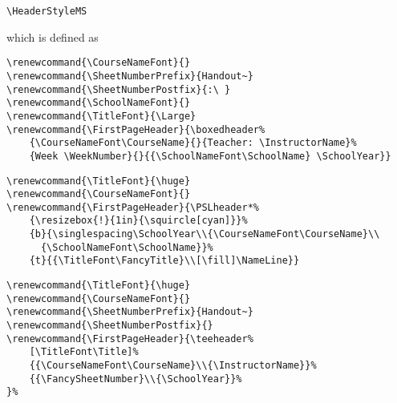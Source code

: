\documentclass[12pt,twoside,parskip,notitle,showframe]{handout}
\begin{document}
\newpage

\begingroup
\HeaderStyleMS
\maketitle
\verb|\HeaderStyleMS|

which is defined as

\singlespacing
\begin{verbatim}
\renewcommand{\CourseNameFont}{}
\renewcommand{\SheetNumberPrefix}{Handout~}
\renewcommand{\SheetNumberPostfix}{:\ }
\renewcommand{\SchoolNameFont}{}
\renewcommand{\TitleFont}{\Large}
\renewcommand{\FirstPageHeader}{\boxedheader%
    {\CourseNameFont\CourseName}{}{Teacher: \InstructorName}%
    {Week \WeekNumber}{}{{\SchoolNameFont\SchoolName} \SchoolYear}}
\end{verbatim}
\endgroup

\newpage

\begingroup
\renewcommand{\Title}{A very very very long title indeed!}
\renewcommand{\TitleFont}{\huge}
\renewcommand{\CourseNameFont}{}
\renewcommand{\FirstPageHeader}{\PSLheader*%
	{\resizebox{!}{1in}{\squircle[cyan]}}%
	{b}{\singlespacing\SchoolYear\\{\CourseNameFont\CourseName}\\{\SchoolNameFont\SchoolName}}%
	{t}{{\TitleFont\FancyTitle}\\[\fill]\NameLine}}
\maketitle
\singlespacing
\begin{verbatim}
\renewcommand{\TitleFont}{\huge}
\renewcommand{\CourseNameFont}{}
\renewcommand{\FirstPageHeader}{\PSLheader*%
    {\resizebox{!}{1in}{\squircle[cyan]}}%
    {b}{\singlespacing\SchoolYear\\{\CourseNameFont\CourseName}\\
      {\SchoolNameFont\SchoolName}}%
    {t}{{\TitleFont\FancyTitle}\\[\fill]\NameLine}}
\end{verbatim}
\endgroup

\newpage

\begingroup
\renewcommand{\TitleFont}{\huge}
\renewcommand{\CourseNameFont}{}
\renewcommand{\SheetNumberPrefix}{Handout~}
\renewcommand{\SheetNumberPostfix}{}
\renewcommand{\FirstPageHeader}{\teeheader%
	[\TitleFont\Title]%
	{{\CourseNameFont\CourseName}\\{\InstructorName}}%
	{{\FancySheetNumber}\\{\SchoolYear}}%
}%
\maketitle
\singlespacing
\begin{verbatim}
\renewcommand{\TitleFont}{\huge}
\renewcommand{\CourseNameFont}{}
\renewcommand{\SheetNumberPrefix}{Handout~}
\renewcommand{\SheetNumberPostfix}{}
\renewcommand{\FirstPageHeader}{\teeheader%
    [\TitleFont\Title]%
    {{\CourseNameFont\CourseName}\\{\InstructorName}}%
    {{\FancySheetNumber}\\{\SchoolYear}}%
}%
\end{verbatim}
\endgroup
\end{document}
